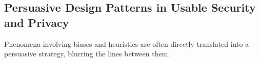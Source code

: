 


	\subsection{Persuasive Design Patterns in Usable Security and Privacy}
	Phenomena involving biases and heuristics are often directly translated into a persuasive strategy, blurring the lines between them.
	
